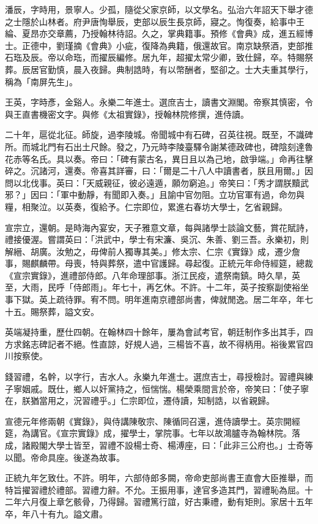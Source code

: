 \begin{pinyinscope}
潘辰，字時用，景寧人。少孤，隨從父家京師，以文學名。弘治六年詔天下舉才德之士隱於山林者。府尹唐恂舉辰，吏部以辰生長京師，寢之。恂復奏，給事中王綸、夏昂亦交章薦，乃授翰林待詔。久之，掌典籍事。預修《會典》成，進五經博士。正德中，劉瑾摘《會典》小疵，復降為典籍，俄還故官。南京缺祭酒，吏部推石珤及辰。帝以命珤，而擢辰編修。居九年，超擢太常少卿，致仕歸，卒。特賜祭葬。辰居官勤慎，晨入夜歸。典制誥時，有以幣酬者，堅卻之。士大夫重其學行，稱為「南屏先生」。

王英，字時彥，金谿人。永樂二年進士。選庶吉士，讀書文淵閣。帝察其慎密，令與王直書機密文字。與修《太祖實錄》，授翰林院修撰，進侍讀。

二十年，扈從北征。師旋，過李陵城。帝聞城中有石碑，召英往視。既至，不識碑所。而城北門有石出土尺餘。發之，乃元時李陵臺驛令謝某德政碑也，碑陰刻達魯花赤等名氏。具以奏。帝曰：「碑有蒙古名，異日且以為己地，啟爭端。」命再往擊碎之。沉諸河，還奏。帝喜其詳審，曰：「爾是二十八人中讀書者，朕且用爾。」因問以北伐事。英曰：「天威親征，彼必遠遁，願勿窮追。」帝笑曰：「秀才謂朕黷武邪？」因曰：「軍中動靜，有聞即入奏。」且諭中官勿阻。立功官軍有過，命勿與糧，相聚泣。以英奏，復給予。仁宗即位，累進右春坊大學士，乞省親歸。

宣宗立，還朝。是時海內宴安，天子雅意文章，每與諸學士談論文藝，賞花賦詩，禮接優渥。嘗謂英曰：「洪武中，學士有宋濂、吳沉、朱善、劉三吾。永樂初，則解縉、胡廣。汝勉之，毋俾前人獨專其美。」修太宗、仁宗《實錄》成，遷少詹事，賜麒麟帶。母喪，特與葬祭，遣中官護歸。尋起復。正統元年命侍經筵，總裁《宣宗實錄》，進禮部侍郎。八年命理部事。浙江民疫，遣祭南鎮。時久旱，英至，大雨，民呼「侍郎雨」。年七十，再乞休。不許。十二年，英子按察副使裕坐事下獄。英上疏待罪。宥不問。明年進南京禮部尚書，俾就閒逸。居二年卒，年七十五。賜祭葬，謚文安。

英端凝持重，歷仕四朝。在翰林四十餘年，屢為會試考官，朝廷制作多出其手，四方求銘志碑記者不絕。性直諒，好規人過，三楊皆不喜，故不得柄用。裕後累官四川按察使。

錢習禮，名幹，以字行，吉水人。永樂九年進士。選庶吉士，尋授檢討。習禮與練子寧姻戚。既仕，鄉人以奸黨持之，恒惴惴。楊榮乘間言於帝，帝笑曰：「使子寧在，朕猶當用之，況習禮乎。」仁宗即位，遷侍讀，知制誥，以省親歸。

宣德元年修兩朝《實錄》，與侍講陳敬宗、陳循同召還，進侍讀學士。英宗開經筵，為講官。《宣宗實錄》成，擢學士，掌院事。七年以故鴻臚寺為翰林院。落成，諸殿閣大學士皆至，習禮不設楊士奇、楊溥座，曰：「此非三公府也。」士奇等以聞。帝命具座。後遂為故事。

正統九年乞致仕。不許。明年，六部侍郎多闕，帝命吏部尚書王直會大臣推舉，而特旨擢習禮於禮部。習禮力辭。不允。王振用事，達官多造其門，習禮恥為屈。十二年六月復上章乞骸骨，乃得歸。習禮篤行誼，好古秉禮，動有矩則。家居十五年卒，年八十有九。謚文肅。


\end{pinyinscope}
